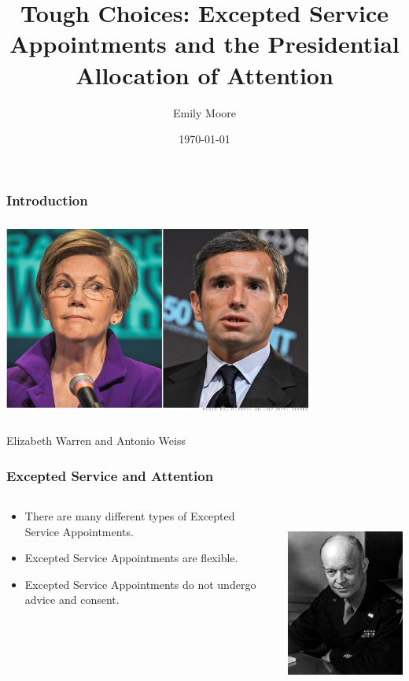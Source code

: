 \documentclass{beamer}
\title[ Tough Choices]{Tough Choices: Excepted Service Appointments and the Presidential Allocation of Attention}
\author{Emily Moore}
\institute[WUSTL]
{
Washington University-St. Louis \\
\medskip
{\emph{emily.moore@wustl.edu}}
}
\date{\today}
\begin{document}


%
\begin{frame}
\titlepage
\end{frame}
%
%
\begin{frame}
\frametitle{Introduction}
\begin{center}
\includegraphics[height=2.6in,width=4in]{WarrenWeiss.png}

Elizabeth Warren and Antonio Weiss
\end{center}

\end{frame}

\begin{frame}
\frametitle{Excepted Service and Attention}

\begin{columns}[T] %
\begin{column}{.48\textwidth}

\begin{itemize}\addtolength{\itemsep}{1.5\baselineskip}
\item There are many different types of Excepted Service Appointments.
\item Excepted Service Appointments are flexible.
\item Excepted Service Appointments do not undergo advice and consent.
\end{itemize}
\end{column}%
\hfill%
\begin{column}{.48\textwidth}

\includegraphics[height=2.5in,width=2in]{eisenhower.jpg}
\end{column}%
\end{columns}
\end{frame}
\end{document}
